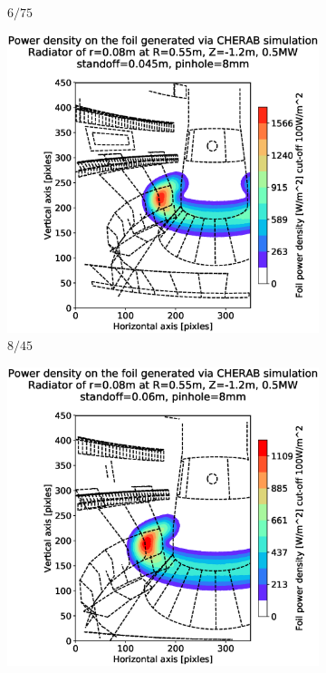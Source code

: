 \begin{figure}
\begin{subfigure}{0.325\textwidth}
         \caption{$6/75$}
         \label{fig:6_75}
     \end{subfigure}
     \begin{subfigure}{0.32\textwidth}
         \centering
         \includegraphics[trim={85 25 49 80},clip,width=\textwidth]{Chapters/chapter2/figs/measured_power_8_45radiator_R0.55_Z-1.2_r0.08.stl.eps}
         \caption{$8/45$}
         \label{fig:8_45}
     \end{subfigure}
     \hfill
     \begin{subfigure}{0.32\textwidth}
         \centering
         \includegraphics[trim={85 25 49 80},clip,width=\textwidth]{Chapters/chapter2/figs/measured_power_8_60radiator_R0.55_Z-1.2_r0.08.stl.eps}

\end{subfigure}
\end{figure}

